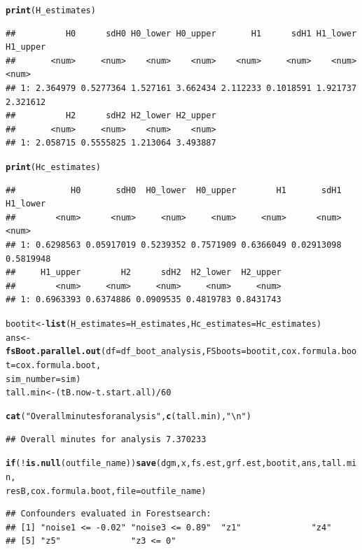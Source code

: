 \documentclass[12pt]{article}
\makeatletter
\newcommand{\hlnum}[1]{\textcolor[rgb]{0.686,0.059,0.569}{#1}}%
\newcommand{\hlstr}[1]{\textcolor[rgb]{0.192,0.494,0.8}{#1}}%
\newcommand{\hlopt}[1]{\textcolor[rgb]{0,0,0}{#1}}%
\newcommand{\hlstd}[1]{\textcolor[rgb]{0.345,0.345,0.345}{#1}}%
\newcommand{\hlkwa}[1]{\textcolor[rgb]{0.161,0.373,0.58}{\textbf{#1}}}%
\newcommand{\hlkwb}[1]{\textcolor[rgb]{0.69,0.353,0.396}{#1}}%
\newcommand{\hlkwc}[1]{\textcolor[rgb]{0.333,0.667,0.333}{#1}}%
\newcommand{\hlkwd}[1]{\textcolor[rgb]{0.737,0.353,0.396}{\textbf{#1}}}%
\newenvironment{kframe}{%
 \def\at@end@of@kframe{}%
 \ifinner\ifhmode%
  \def\at@end@of@kframe{\end{minipage}}%
  \begin{minipage}{\columnwidth}%
 \fi\fi%
 \def\FrameCommand##1{\hskip\@totalleftmargin \hskip-\fboxsep
 \colorbox{shadecolor}{##1}\hskip-\fboxsep
     \hskip-\linewidth \hskip-\@totalleftmargin \hskip\columnwidth}%
 \MakeFramed {\advance\hsize-\width
   \@totalleftmargin\z@ \linewidth\hsize
   \@setminipage}}%
 {\par\unskip\endMakeFramed%
 \at@end@of@kframe}
\newenvironment{knitrout}{}{} %
\makeatother
\begin{document}
\begin{knitrout}
\begin{kframe}
\begin{alltt}
\hlkwd{print}\hlstd{(H_estimates)}
\end{alltt}
\begin{verbatim}
##          H0      sdH0 H0_lower H0_upper       H1      sdH1 H1_lower H1_upper
##       <num>     <num>    <num>    <num>    <num>     <num>    <num>    <num>
## 1: 2.364979 0.5277364 1.527161 3.662434 2.112233 0.1018591 1.921737 2.321612
##          H2      sdH2 H2_lower H2_upper
##       <num>     <num>    <num>    <num>
## 1: 2.058715 0.5555825 1.213064 3.493887
\end{verbatim}
\begin{alltt}
\hlkwd{print}\hlstd{(Hc_estimates)}
\end{alltt}
\begin{verbatim}
##           H0       sdH0  H0_lower  H0_upper        H1       sdH1  H1_lower
##        <num>      <num>     <num>     <num>     <num>      <num>     <num>
## 1: 0.6298563 0.05917019 0.5239352 0.7571909 0.6366049 0.02913098 0.5819948
##     H1_upper        H2      sdH2  H2_lower  H2_upper
##        <num>     <num>     <num>     <num>     <num>
## 1: 0.6963393 0.6374886 0.0909535 0.4819783 0.8431743
\end{verbatim}
\begin{alltt}
\hlstd{bootit} \hlkwb{<-} \hlkwd{list}\hlstd{(}\hlkwc{H_estimates} \hlstd{= H_estimates,} \hlkwc{Hc_estimates} \hlstd{= Hc_estimates)}
\hlstd{ans} \hlkwb{<-} \hlkwd{fsBoot.parallel.out}\hlstd{(}\hlkwc{df} \hlstd{= df_boot_analysis,} \hlkwc{FSboots} \hlstd{= bootit,} \hlkwc{cox.formula.boot} \hlstd{= cox.formula.boot,}
    \hlkwc{sim_number} \hlstd{= sim)}
\hlstd{tall.min} \hlkwb{<-} \hlstd{(tB.now} \hlopt{-} \hlstd{t.start.all)}\hlopt{/}\hlnum{60}

\hlkwd{cat}\hlstd{(}\hlstr{"Overall minutes for analysis"}\hlstd{,} \hlkwd{c}\hlstd{(tall.min),} \hlstr{"\textbackslash{}n"}\hlstd{)}
\end{alltt}
\begin{verbatim}
## Overall minutes for analysis 7.370233
\end{verbatim}
\begin{alltt}
\hlkwa{if} \hlstd{(}\hlopt{!}\hlkwd{is.null}\hlstd{(outfile_name))} \hlkwd{save}\hlstd{(dgm, x, fs.est, grf.est, bootit, ans, tall.min,}
    \hlstd{resB, cox.formula.boot,} \hlkwc{file} \hlstd{= outfile_name)}
\end{alltt}
\end{kframe}
\end{knitrout}


\begin{knitrout}
\color{fgcolor}\begin{kframe}
\begin{verbatim}
## Confounders evaluated in Forestsearch:
## [1] "noise1 <= -0.02" "noise3 <= 0.89"  "z1"              "z4"             
## [5] "z5"              "z3 <= 0"
\end{verbatim}
\end{kframe}
\end{knitrout}
\end{document}
